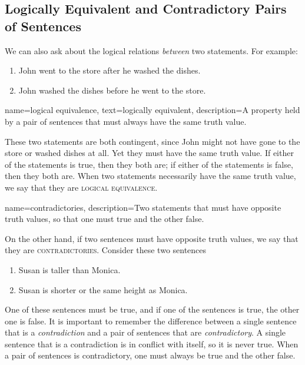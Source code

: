 
\subsection{Logically Equivalent and Contradictory Pairs of Sentences}

We can also ask about the logical relations \emph{between} two statements. For example:

\begin{enumerate}[label=(\alph*)]
\item John went to the store after he washed the dishes.
\item John washed the dishes before he went to the store.
\end{enumerate}

{
name={logical equivalence},
text={logically equivalent},
description={A property held by a pair of sentences that must always have the same truth value.}
}

These two statements are both contingent, since John might not have gone to the store or washed dishes at all. Yet they must have the same truth value. If either of the statements is true, then they both are; if either of the statements is false, then they both are. When two statements necessarily have the same truth value, we say that they are \textsc{\gls{logical equivalence}}. \label{def:logical_equivalence}

{
name=contradictories,
description={Two statements that must have opposite truth values, so that one must true and the other false.}
}

On the other hand, if two sentences must have opposite truth values, we say that they are \textsc{\gls{contradictories}}. \label{def:contradictory}Consider these two sentences 

\begin{enumerate}[label=(\alph*)]
\item Susan is taller than Monica.
\item Susan is shorter or the same height as Monica.
\end{enumerate}

One of these sentences must be true, and if one of the sentences is true, the other one is false. It is important to remember the difference between a single sentence that is a \emph{contradiction} and a pair of sentences that are \emph{contradictory}. A single sentence that is a contradiction is in conflict with itself, so it is never true. When a pair of sentences is contradictory, one must always be true and the other false.

